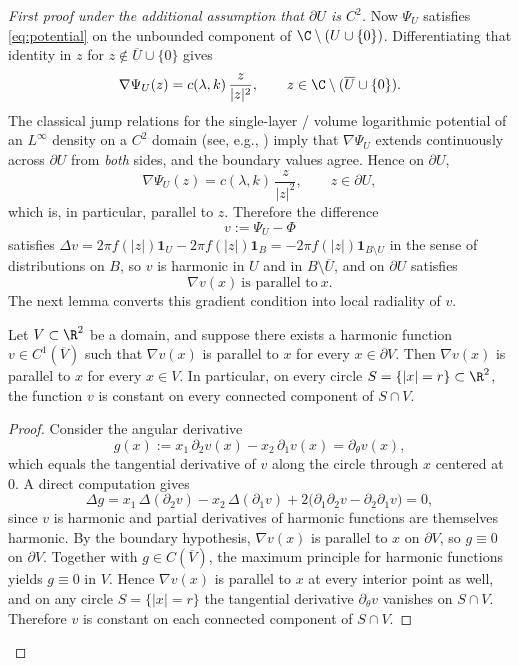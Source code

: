 \begin{proof}[First proof under the additional assumption that $\partial U$ is $C^2$]
Now $\Psi_U$ satisfies \eqref{eq:potential} on the unbounded
component of $\C\setminus(U\cup\{0\})$. Differentiating that identity
in $z$ for $z\not\in \overline{U}\cup\{0\}$ gives
\[
\nabla \Psi_U(z)=c(\lambda,k)\,\frac{z}{|z|^2},
\qquad z\in \C\setminus(\overline{U}\cup\{0\}).
\]
The classical jump relations for the single-layer / volume logarithmic
potential of an $L^\infty$ density on a $C^2$ domain (see, e.g.,
\cite{Gustafsson}) imply that $\nabla\Psi_U$ extends continuously
across $\partial U$ from \emph{both} sides, and the boundary values
agree. Hence on $\partial U$,
\[
\nabla \Psi_U(z)=c(\lambda,k)\,\frac{z}{|z|^2},
\qquad z\in \partial U,
\]
which is, in particular, parallel to $z$. Therefore the difference
\[
v:=\Psi_U-\Phi
\]
satisfies $\Delta v=2\pi f(|z|)\mathbf 1_U-2\pi f(|z|)\mathbf 1_B
=-2\pi f(|z|)\mathbf 1_{B\setminus U}$ in the sense of distributions
on $B$, so $v$ is harmonic in $U$ and in $B\setminus\overline{U}$, and
on $\partial U$ satisfies
\[
\nabla v(x)\ \text{is parallel to}\ x.
\]
The next lemma converts this gradient condition into local radiality of $v$.

\begin{lemma}\label{lem:harmonic-locally-radial}
Let $V\subset \R^2$ be a domain, and suppose there exists a harmonic
function $v\in C^1(\overline{V})$ such that $\nabla v(x)$ is parallel to
$x$ for every $x\in \partial V$. Then $\nabla v(x)$ is parallel to $x$
for every $x\in V$. In particular, on every circle
$S=\{|x|=r\}\subset \R^2$, the function $v$ is constant on every
connected component of $S\cap V$.
\end{lemma}

\begin{proof}
Consider the angular derivative
\[
g(x):=x_1\,\partial_2 v(x)-x_2\,\partial_1 v(x)
=\partial_\theta v(x),
\]
which equals the tangential derivative of $v$ along the circle
through $x$ centered at $0$. A direct computation gives
\[
\Delta g
=x_1\,\Delta(\partial_2 v)-x_2\,\Delta(\partial_1 v)
+2\big(\partial_1\partial_2 v-\partial_2\partial_1 v\big)
=0,
\]
since $v$ is harmonic and partial derivatives of harmonic functions
are themselves harmonic. By the boundary hypothesis, $\nabla v(x)$ is
parallel to $x$ on $\partial V$, so $g\equiv 0$ on $\partial V$.
Together with $g\in C(\overline{V})$, the maximum principle for
harmonic functions yields $g\equiv 0$ in $V$. Hence $\nabla v(x)$ is
parallel to $x$ at every interior point as well, and on any circle
$S=\{|x|=r\}$ the tangential derivative $\partial_\theta v$ vanishes
on $S\cap V$. Therefore $v$ is constant on each connected component
of $S\cap V$.
\end{proof}


\end{proof}

